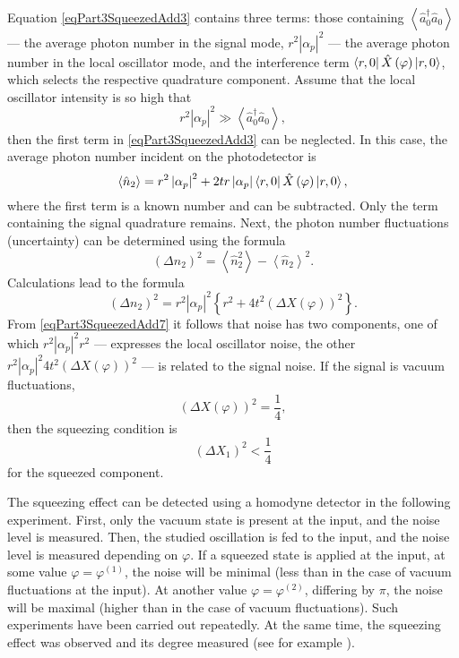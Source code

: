 Equation \eqref{eqPart3SqueezedAdd3} contains three terms: those containing 
$\left<\hat{a}_0^{\dag}\hat{a}_0\right>$ — the average photon number in the signal mode, $r^2\left|\alpha_p\right|^2$ — the average photon number in the local oscillator mode, and the interference term 
$\bra{r, 0}\hat{X}\left(\varphi\right)\ket{r, 0}$,
which selects the respective quadrature component. Assume that
the local oscillator intensity is so high that 
\[
r^2 \left|\alpha_p\right|^2 \gg 
\left<\hat{a}_0^{\dag}\hat{a}_0\right>,
\]
then the first term in \eqref{eqPart3SqueezedAdd3} can be neglected. In
this case, the average photon number incident on the photodetector is
\begin{equation}
\left<\hat{n}_2\right> = 
r^2 \left|\alpha_p\right|^2 + 2 t r \left|\alpha_p\right|
\bra{r, 0}\hat{X}\left(\varphi\right)\ket{r, 0},
\nonumber
\end{equation}
where the first term is a known number and can be
subtracted. Only the term containing the signal quadrature remains. Next,
the photon number fluctuations (uncertainty) can be determined using the formula
\begin{equation}
\left(\Delta n_2\right)^2 = 
\left<\hat{n}_2^2\right>
-
\left<\hat{n}_2\right>^2.
\nonumber
\end{equation}
Calculations lead to the formula
\begin{equation}
\left(\Delta n_2\right)^2 =
r^2 \left|\alpha_p\right|^2
\left\{
r^2 + 4 t^2 
\left(
\Delta X \left(\varphi\right)
\right)^2
\right\}.
\label{eqPart3SqueezedAdd7}
\end{equation}
From \eqref{eqPart3SqueezedAdd7} it follows that noise has two
components, one of which $r^2 \left|\alpha_p\right|^2 r^2$ —
expresses the local oscillator noise, the other 
$r^2 \left|\alpha_p\right|^2 4 t^2 
\left(
\Delta X \left(\varphi\right)
\right)^2$ — is related to the signal noise. If the signal is vacuum
fluctuations,
\[
\left(\Delta X \left(\varphi\right)\right)^2  = \frac{1}{4},
\]
then the squeezing condition is
\[
\left(\Delta X_1 \right)^2 < \frac{1}{4}
\]
for the squeezed component.

The squeezing effect can be detected using
a homodyne detector in the following experiment. First, only the vacuum state
is present at the input, and the noise level is measured. Then, the studied oscillation is fed to the input, and the noise
level is measured depending on $\varphi$. If a squeezed
state is applied at the input, at some value $\varphi = \varphi^{(1)}$,
the noise will be minimal (less than in the case of vacuum fluctuations at the input). At
another value $\varphi = \varphi^{(2)}$, differing by $\pi$, the noise
will be maximal (higher than in the case of vacuum
fluctuations). Such experiments have been carried out repeatedly. At the same time,
the squeezing effect was observed and its degree measured (see for example
\cite{bNonclassSqueezedStateDetection}).

